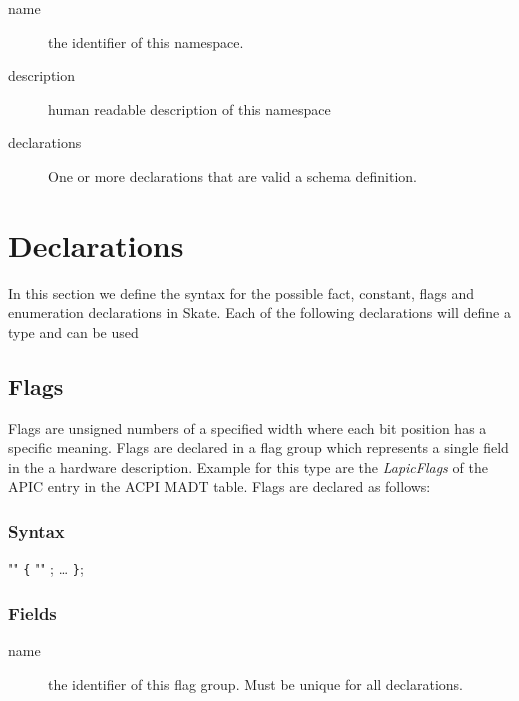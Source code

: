 \documentclass[a4paper,11pt,twoside]{report}
\begin{document}
{{\begin{description}
    \item[name] the identifier of this namespace.
    
    \item[description] human readable description of this namespace
    
    \item[declarations] One or more declarations that are valid a schema 
    definition.
\end{description}



\section{Declarations}\label{sec:decl:decls}

In this section we define the syntax for the possible fact, constant, flags
and enumeration declarations in Skate. Each of the following declarations will
define a type and can be used 

\subsection{Flags}
\label{sec:decl:flags}

Flags are unsigned numbers of a specified width where each bit position has a
specific meaning. Flags are declared in a flag group which represents a single
field in the a hardware description. Example for this type are the 
\emph{LapicFlags} of the APIC entry in the ACPI MADT table. Flags are declared 
as follows:

\subsubsection{Syntax}

\begin{syntax}
   "" \verb+{+
      "" ;
    \ldots
\verb+}+;
\end{syntax}

\subsubsection{Fields}

\begin{description}
    \item[name] the identifier of this flag group. Must be unique for all 
                declarations.
    

\end{description}}}
\end{document}
